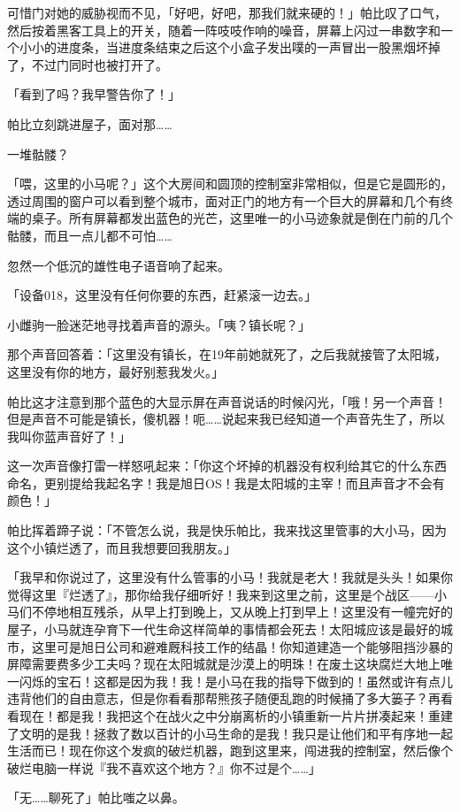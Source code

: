 可惜门对她的威胁视而不见，「好吧，好吧，那我们就来硬的！」帕比叹了口气，然后按着黑客工具上的开关，随着一阵吱吱作响的噪音，屏幕上闪过一串数字和一个小小的进度条，当进度条结束之后这个小盒子发出噗的一声冒出一股黑烟坏掉了，不过门同时也被打开了。

「看到了吗？我早警告你了！」

帕比立刻跳进屋子，面对那……

一堆骷髅？

「喂，这里的小马呢？」这个大房间和圆顶的控制室非常相似，但是它是圆形的，透过周围的窗户可以看到整个城市，面对正门的地方有一个巨大的屏幕和几个有终端的桌子。所有屏幕都发出蓝色的光芒，这里唯一的小马迹象就是倒在门前的几个骷髅，而且一点儿都不可怕……

忽然一个低沉的雄性电子语音响了起来。

「设备018，这里没有任何你要的东西，赶紧滚一边去。」

小雌驹一脸迷茫地寻找着声音的源头。「咦？镇长呢？」

那个声音回答着：「这里没有镇长，在19年前她就死了，之后我就接管了太阳城，这里没有你的地方，最好别惹我发火。」

帕比这才注意到那个蓝色的大显示屏在声音说话的时候闪光，「哦！另一个声音！但是声音不可能是镇长，傻机器！呃……说起来我已经知道一个声音先生了，所以我叫你蓝声音好了！」

这一次声音像打雷一样怒吼起来：「你这个坏掉的机器没有权利给其它的什么东西命名，更别提给我起名字！我是旭日OS！我是太阳城的主宰！而且声音才不会有颜色！」

帕比挥着蹄子说：「不管怎么说，我是快乐帕比，我来找这里管事的大小马，因为这个小镇烂透了，而且我想要回我朋友。」

「我早和你说过了，这里没有什么管事的小马！我就是老大！我就是头头！如果你觉得这里『烂透了』，那你给我仔细听好！我来到这里之前，这里是个战区——小马们不停地相互残杀，从早上打到晚上，又从晚上打到早上！这里没有一幢完好的屋子，小马就连孕育下一代生命这样简单的事情都会死去！太阳城应该是最好的城市，这里可是旭日公司和避难厩科技工作的结晶！你知道建造一个能够阻挡沙暴的屏障需要费多少工夫吗？现在太阳城就是沙漠上的明珠！在废土这块腐烂大地上唯一闪烁的宝石！这都是因为我！我！是小马在我的指导下做到的！虽然或许有点儿违背他们的自由意志，但是你看看那帮熊孩子随便乱跑的时候捅了多大篓子？再看看现在！都是我！我把这个在战火之中分崩离析的小镇重新一片片拼凑起来！重建了文明的是我！拯救了数以百计的小马生命的是我！我只是让他们和平有序地一起生活而已！现在你这个发疯的破烂机器，跑到这里来，闯进我的控制室，然后像个破烂电脑一样说『我不喜欢这个地方？』你不过是个……」

「无……聊死了」帕比嗤之以鼻。

